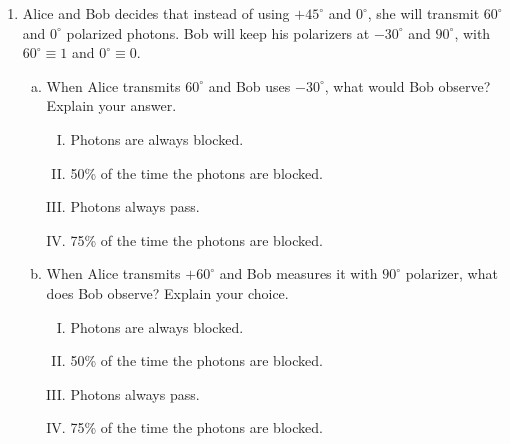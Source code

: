 \documentclass[12pt]{article}
\newcommand\tbf[1]{\textbf{#1}}
\newcommand\ta{\tbf{Alice: }}
\newcommand\tp{\tbf{Prof.: }}
\begin{document}
\begin{enumerate}[1.]
\ta If someone is eavesdropping, then there will be some discrepancy in the result! How elegant! \newline
\tp Yes, it is. So, after the cross check if there is some discrepancy, just discard the key and try some other time! \newline
\ta Thank you so very much, Prof. Griffiths! \newline
\tp I wish you all the best, Alice. \newline
\begin{center}
\tbf{Scene III}
\end{center}
\begin{center}
[Mr. Wilson's room: Alice enters.]
\end{center}
\ta Hello, Mr. Wilson! I finally got it! \newline
\tbf{Mr. Wilson:} That is great! Here is a reference: \emph{Bethune and Risk (2000), IEEE Journal 36(3) 340-7} of how it is implemented. \newline
\ta Thanks, Mr. Wilson! I will look over it and get back to you.
\newpage
\item Alice and Bob decides that instead of using $+45^\circ$ and $0^\circ$, she will transmit $60^\circ$ and $0^\circ$ polarized photons. Bob will keep his polarizers at $-30^\circ$ and $90^\circ$, with $60^\circ \equiv 1$ and $0^\circ \equiv 0$.
\begin{enumerate}[a)]
\item When Alice transmits $60^\circ$ and Bob uses $-30^\circ$, what would Bob observe? Explain your answer.
\begin{enumerate}[I.]
\item Photons are always blocked.
\item 50\% of the time the photons are blocked.
\item Photons always pass.
\item 75\% of the time the photons are blocked.
\end{enumerate}
\item When Alice transmits $+60^\circ$ and Bob measures it with $90^\circ$ polarizer, what does Bob observe? Explain your choice.
\begin{enumerate}[I.]
\item Photons are always blocked.
\item 50\% of the time the photons are blocked.
\item Photons always pass.
\item 75\% of the time the photons are blocked.
\end{enumerate}

\end{enumerate}
\end{enumerate}
\end{document}
